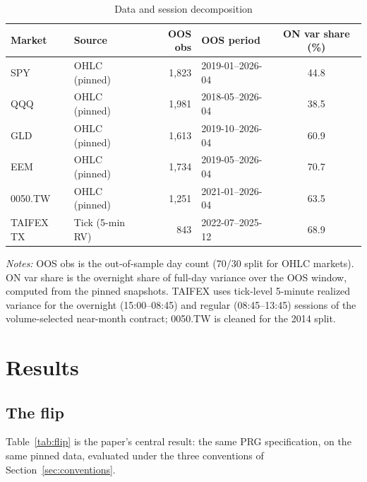 \documentclass[11pt,a4paper]{article}
\begin{document}
\begin{table}[htbp]
\centering
\caption{Data and session decomposition}
\label{tab:data}
\small
\begin{tabular}{llrlc}
\toprule
Market & Source & OOS obs & OOS period & ON var share (\%) \\
\midrule
SPY        & OHLC (pinned)   & 1{,}823 & 2019-01--2026-04 & 44.8 \\
QQQ        & OHLC (pinned)   & 1{,}981 & 2018-05--2026-04 & 38.5 \\
GLD        & OHLC (pinned)   & 1{,}613 & 2019-10--2026-04 & 60.9 \\
EEM        & OHLC (pinned)   & 1{,}734 & 2019-05--2026-04 & 70.7 \\
0050.TW    & OHLC (pinned)   & 1{,}251 & 2021-01--2026-04 & 63.5 \\
TAIFEX TX  & Tick (5-min RV) & 843     & 2022-07--2025-12 & 68.9 \\
\bottomrule
\end{tabular}
\begin{flushleft}
\footnotesize
\emph{Notes:} OOS obs is the out-of-sample day count (70/30 split for OHLC markets). ON var share is the overnight share of full-day variance over the OOS window, computed from the pinned snapshots. TAIFEX uses tick-level 5-minute realized variance for the overnight (15:00--08:45) and regular (08:45--13:45) sessions of the volume-selected near-month contract; 0050.TW is cleaned for the 2014 split.
\end{flushleft}
\end{table}

\section{Results}
\label{sec:results}

\subsection{The flip}

Table~\ref{tab:flip} is the paper's central result: the same PRG specification, on the same pinned data, evaluated under the three conventions of Section~\ref{sec:conventions}.
\end{document}

